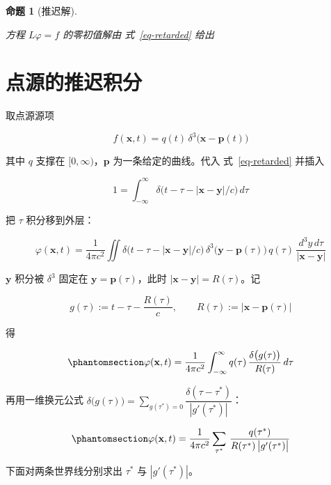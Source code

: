 \documentclass[
  chinese,
  a4paper,
  UTF8,
  12pt,
  oneside,
  openany]{ctexbook}
\theoremstyle{plain}
\theoremstyle{plain}
\theoremstyle{plain}
\newtheorem{proposition}{命题}[chapter]
\theoremstyle{definition}
\theoremstyle{plain}
\theoremstyle{plain}
\theoremstyle{remark}
\begin{document}
\begin{proposition}[推迟解]\protect\hypertarget{prp-retarded-form}{}\label{prp-retarded-form}

方程 \(L\varphi=f\) 的零初值解由 式~\ref{eq-retarded} 给出

\end{proposition}

\section{点源的推迟积分}\label{sec-tsf-point-source}

取点源源项

\[
f(\mathbf{x},t)=q(t)\,\delta^{3}\bigl(\mathbf{x}-\mathbf{p}(t)\bigr)
\]

其中 \(q\) 支撑在 \([0,\infty)\)，\(\mathbf{p}\) 为一条给定的曲线。代入
式~\ref{eq-retarded} 并插入

\[
1=\int_{-\infty}^{\infty}\delta\bigl(t-\tau-|\mathbf{x}-\mathbf{y}|/c\bigr)\,d\tau
\]

把 \(\tau\) 积分移到外层：

\[
\varphi(\mathbf{x},t)=\frac{1}{4\pi c^{2}}\iint
\delta\bigl(t-\tau-|\mathbf{x}-\mathbf{y}|/c\bigr)\,
\delta^{3}\bigl(\mathbf{y}-\mathbf{p}(\tau)\bigr)\,q(\tau)\,
\frac{d^{3}y\,d\tau}{|\mathbf{x}-\mathbf{y}|}
\]

\(\mathbf{y}\) 积分被 \(\delta^{3}\) 固定在
\(\mathbf{y}=\mathbf{p}(\tau)\)，此时
\(|\mathbf{x}-\mathbf{y}|=R(\tau)\)。记

\[
g(\tau):=t-\tau-\frac{R(\tau)}{c},\qquad R(\tau):=|\mathbf{x}-\mathbf{p}(\tau)|
\]

得

\begin{equation}\protect\phantomsection\label{eq-retarded-integral}{
\varphi(\mathbf{x},t)=\frac{1}{4\pi c^{2}}\int_{-\infty}^{\infty}q(\tau)\,
\frac{\delta\bigl(g(\tau)\bigr)}{R(\tau)}\,d\tau
}\end{equation}

再用一维换元公式
\(\delta\bigl(g(\tau)\bigr)=\sum_{g(\tau^{*})=0}\dfrac{\delta(\tau-\tau^{*})}{|g'(\tau^{*})|}\)：

\begin{equation}\protect\phantomsection\label{eq-retarded-sum}{
\varphi(\mathbf{x},t)=\frac{1}{4\pi c^{2}}\sum_{\tau^{*}}\,
\frac{q(\tau^{*})}{R(\tau^{*})\,\bigl|g'(\tau^{*})\bigr|}
}\end{equation}

下面对两条世界线分别求出 \(\tau^{*}\) 与 \(|g'(\tau^{*})|\)。
\end{document}
